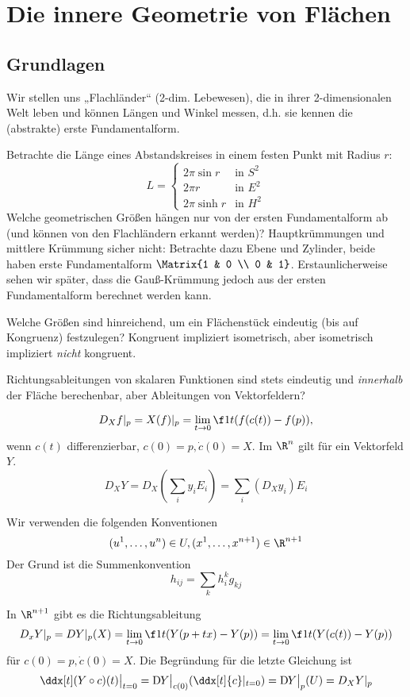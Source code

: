 \chapter{Die innere Geometrie von Flächen}


\section{Grundlagen}

Wir stellen uns „Flachländer“ (2-dim. Lebewesen), die in ihrer 2-dimensionalen Welt leben und können Längen und Winkel messen, d.h. sie kennen die (abstrakte) erste Fundamentalform.

Betrachte die Länge eines Abstandskreises in einem festen Punkt mit Radius $r$:
\[
	L = \begin{cases}
		2\pi \sin r & \text{in $S^2$} \\
		2\pi r & \text{in $E^2$} \\
		2\pi \sinh r & \text{in $H^2$}
	\end{cases}
\]
Welche geometrischen Größen hängen nur von der ersten Fundamentalform ab (und können von den Flachländern erkannt werden)?
Hauptkrümmungen und mittlere Krümmung sicher nicht:
Betrachte dazu Ebene und Zylinder, beide haben erste Fundamentalform $\Matrix{1 & 0 \\ 0 & 1}$.
Erstaunlicherweise sehen wir später, dass die Gauß-Krümmung jedoch aus der ersten Fundamentalform berechnet werden kann.

Welche Größen sind hinreichend, um ein Flächenstück eindeutig (bis auf Kongruenz) festzulegen?
Kongruent impliziert isometrisch, aber isometrisch impliziert \emph{nicht} kongruent.

Richtungsableitungen von skalaren Funktionen sind stets eindeutig und \emph{innerhalb} der Fläche berechenbar, aber Ableitungen von Vektorfeldern?

\[
	D_X f|_p = X(f)|_p
	= \lim_{t\to 0} \f 1t (f(c(t)) - f(p)),
\]
wenn $c(t)$ differenzierbar, $c(0) = p, \dot c(0) = X$.
Im $\R^n$ gilt für ein Vektorfeld $Y$.
\[
	D_X Y = D_X(\sum_{i} y_i E_i)
	= \sum_{i} (D_X y_i) E_i
\]


Wir verwenden die folgenden Konventionen
\[
	(u^1, \dotsc, u^n) \in U,
	(x^1, \dotsc, x^{n+1}) \in \R^{n+1}
\]
Der Grund ist die Summenkonvention
\[
	h_{ij} = \sum_{k} h_i^k g_{kj}
\]

In $\R^{n+1}$ gibt es die Richtungsableitung
\[
	D_xY|_p = DY|_p(X)
	= \lim_{t\to 0} \f 1t (Y(p+tx) - Y(p))
	= \lim_{t\to 0} \f 1t (Y(c(t)) - Y(p))
\]
für $c(0) = p, \dot c(0) = X$.
Die Begründung für die letzte Gleichung ist
\[
	\ddx[t](Y \circ c)(t) \big|_{t=0}
	= \Df[Y]\big|_{c(0)} (\ddx[t]{c}|_{t=0})
	= \Df[Y]\big|_{p}(U)
	= D_X Y|_p
\]

